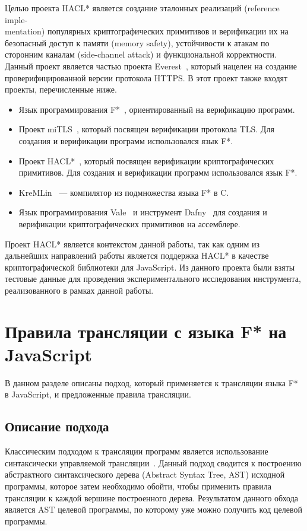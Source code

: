 Целью проекта HACL* является создание эталонных реализаций (reference imple-\\mentation) популярных криптографических примитивов и верификации их на безопасный доступ к памяти (memory safety), устойчивости к атакам по сторонним каналам (side-channel attack) и функциональной корректности. Данный проект является частью проекта Everest~\cite{everest}, который нацелен на создание проверифицированной версии протокола HTTPS. В этот проект также входят проекты, перечисленные ниже.

\begin{itemize}
    \item Язык программирования F*~\cite{fstar}, ориентированный на верификацию программ.
    \item Проект miTLS~\cite{mitls}, который посвящен верификации протокола TLS. Для создания и верификации программ использовался язык F*.
    \item Проект HACL*~\cite{hacl_star}, который посвящен верификации криптографических примитивов. Для создания и верификации программ использовался язык F*.  
    \item KreMLin~\cite{kremlin} --- компилятор из подмножества языка F* в C.
    \item Язык программирования Vale~\cite{vale} и инструмент Dafny~\cite{dafny} для создания и верификации криптографических примитивов на ассемблере.
\end{itemize}

Проект HACL* является контекстом данной работы, так как одним из дальнейших направлений работы является поддержка HACL* в качестве криптографической библиотеки для JavaScript. Из данного проекта были взяты тестовые данные для проведения экспериментального исследования инструмента, реализованного в рамках данной работы.


\section{Правила трансляции с языка F* на JavaScript}

В данном разделе описаны подход, который применяется к трансляции языка F* в JavaScript, и предложенные правила трансляции.

\subsection{Описание подхода}

Классическим подходом к трансляции программ является использование синтаксически управляемой трансляции~\cite{dragons}. Данный подход сводится к построению абстрактного синтаксического дерева (Abstract Syntax Tree, AST) исходной программы, которое затем необходимо обойти, чтобы применить правила трансляции к каждой вершине построенного дерева. Результатом данного обхода является AST целевой программы, по которому уже можно получить код целевой программы. 

